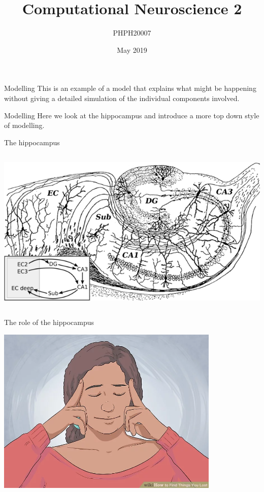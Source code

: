 \documentclass{beamer}
\title[Computational Neuroscience 2]{Computational Neuroscience 2}
\author{PHPH20007}
\institute{\texttt{github.com/conorhoughton/PHPH20007}}
\date{May 2019}
\begin{document}
\maketitle

\begin{frame}{Modelling}
This is an example of a model that explains what might be happening without giving a detailed simulation of the individual components involved.
  \end{frame}

\begin{frame}{Modelling}
  Here we look at the hippocampus and introduce a more top down style
  of modelling.
\end{frame}
  
\begin{frame}{The hippocampus}
  \begin{center}
    \includegraphics[height=8cm]{hippocampus.png}
  \end{center}
      \vfill
\end{frame}

\begin{frame}{The role of the hippocampus}
  \begin{center}
    \includegraphics[height=8cm]{finding_lost_items.jpg}
  \end{center}
      \vfill
\end{frame}
\end{document}

